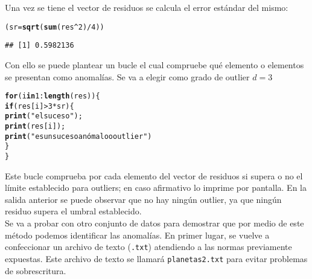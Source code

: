 \documentclass[12pt]{report}\usepackage[]{graphicx}\usepackage[dvipsnames]{xcolor}
\makeatletter
\newcommand{\hlnum}[1]{\textcolor[rgb]{0.686,0.059,0.569}{#1}}%
\newcommand{\hlstr}[1]{\textcolor[rgb]{0.192,0.494,0.8}{#1}}%
\newcommand{\hlopt}[1]{\textcolor[rgb]{0,0,0}{#1}}%
\newcommand{\hlstd}[1]{\textcolor[rgb]{0.345,0.345,0.345}{#1}}%
\newcommand{\hlkwa}[1]{\textcolor[rgb]{0.161,0.373,0.58}{\textbf{#1}}}%
\newcommand{\hlkwb}[1]{\textcolor[rgb]{0.69,0.353,0.396}{#1}}%
\newcommand{\hlkwd}[1]{\textcolor[rgb]{0.737,0.353,0.396}{\textbf{#1}}}%
\newenvironment{kframe}{%
 \def\at@end@of@kframe{}%
 \ifinner\ifhmode%
  \def\at@end@of@kframe{\end{minipage}}%
  \begin{minipage}{\columnwidth}%
 \fi\fi%
 \def\FrameCommand##1{\hskip\@totalleftmargin \hskip-\fboxsep
 \colorbox{shadecolor}{##1}\hskip-\fboxsep
     \hskip-\linewidth \hskip-\@totalleftmargin \hskip\columnwidth}%
 \MakeFramed {\advance\hsize-\width
   \@totalleftmargin\z@ \linewidth\hsize
   \@setminipage}}%
 {\par\unskip\endMakeFramed%
 \at@end@of@kframe}
\newenvironment{knitrout}{}{} %
\makeatother
\begin{document}
			 Una vez se tiene el vector de residuos se calcula el error estándar del mismo:
			 
\begin{knitrout}
\color{fgcolor}\begin{kframe}
\begin{alltt}
\hlstd{(sr} \hlkwb{=} \hlkwd{sqrt}\hlstd{(}\hlkwd{sum}\hlstd{(res}\hlopt{^}\hlnum{2}\hlstd{)}\hlopt{/}\hlnum{4}\hlstd{))}
\end{alltt}
\begin{verbatim}
## [1] 0.5982136
\end{verbatim}
\end{kframe}
\end{knitrout}
			 
			 Con ello se puede plantear un bucle el cual compruebe qué elemento o elementos se presentan como anomalías. Se va a elegir como grado de outlier $d = 3$
			 
\begin{knitrout}
\color{fgcolor}\begin{kframe}
\begin{alltt}
\hlkwa{for} \hlstd{(i} \hlkwa{in} \hlnum{1}\hlopt{:}\hlkwd{length}\hlstd{(res))\{}
        \hlkwa{if}\hlstd{(res[i]}\hlopt{>}\hlnum{3}\hlopt{*}\hlstd{sr)\{}
                \hlkwd{print}\hlstd{(}\hlstr{"el suceso"}\hlstd{);}
                \hlkwd{print}\hlstd{(res[i]);}
                \hlkwd{print}\hlstd{(}\hlstr{"es un suceso anómalo o outlier"}\hlstd{)}
                                \hlstd{\}}
\hlstd{\}}
\end{alltt}
\end{kframe}
\end{knitrout}
			 
			 Este bucle comprueba por cada elemento del vector de residuos si supera o no el límite establecido para outliers; en caso afirmativo lo imprime por pantalla. En la salida anterior se puede observar que no hay ningún outlier, ya que ningún residuo supera el umbral establecido.\\ 
			 
			 Se va a probar con otro conjunto de datos para demostrar que por medio de este método podemos identificar las anomalías. En primer lugar, se vuelve a confeccionar un archivo de texto (\texttt{.txt}) atendiendo a las normas previamente expuestas. Este archivo de texto se llamará \texttt{planetas2.txt} para evitar problemas de sobrescritura. 
			
\end{document}
